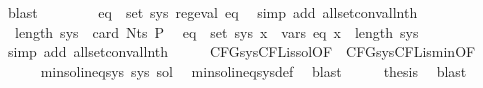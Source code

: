 \begin{isabellebody}
\ blast\isanewline
\ \ \isamarkupfalse%
\ \isamarkupfalse%
\ {\isacharasterisk}{\kern0pt}\ \isamarkupfalse%
\ {\isachardoublequoteopen}{\isasymforall}eq\ {\isasymin}\ set\ sys{\isachardot}{\kern0pt}\ reg{\isacharunderscore}{\kern0pt}eval\ eq{\isachardoublequoteclose}\ \isamarkupfalse%
\ {\isacharparenleft}{\kern0pt}simp\ add{\isacharcolon}{\kern0pt}\ all{\isacharunderscore}{\kern0pt}set{\isacharunderscore}{\kern0pt}conv{\isacharunderscore}{\kern0pt}all{\isacharunderscore}{\kern0pt}nth{\isacharparenright}{\kern0pt}\isanewline
\ \ \isamarkupfalse%
\ \isamarkupfalse%
\ {\isacharasterisk}{\kern0pt}\ {\isacartoucheopen}length\ sys\ {\isacharequal}{\kern0pt}\ card\ {\isacharparenleft}{\kern0pt}Nts\ P{\isacharparenright}{\kern0pt}{\isacartoucheclose}\ \isamarkupfalse%
\ {\isachardoublequoteopen}{\isasymforall}eq\ {\isasymin}\ set\ sys{\isachardot}{\kern0pt}\ {\isasymforall}x\ {\isasymin}\ vars\ eq{\isachardot}{\kern0pt}\ x\ {\isacharless}{\kern0pt}\ length\ sys{\isachardoublequoteclose}\isanewline
\ \ \ \ \isamarkupfalse%
\ {\isacharparenleft}{\kern0pt}simp\ add{\isacharcolon}{\kern0pt}\ all{\isacharunderscore}{\kern0pt}set{\isacharunderscore}{\kern0pt}conv{\isacharunderscore}{\kern0pt}all{\isacharunderscore}{\kern0pt}nth{\isacharparenright}{\kern0pt}\isanewline
\ \ \isamarkupfalse%
\ \isamarkupfalse%
\ CFG{\isacharunderscore}{\kern0pt}sys{\isacharunderscore}{\kern0pt}CFL{\isacharunderscore}{\kern0pt}is{\isacharunderscore}{\kern0pt}sol{\isacharbrackleft}{\kern0pt}OF\ {\isacharasterisk}{\kern0pt}{\isacharbrackright}{\kern0pt}\ CFG{\isacharunderscore}{\kern0pt}sys{\isacharunderscore}{\kern0pt}CFL{\isacharunderscore}{\kern0pt}is{\isacharunderscore}{\kern0pt}min{\isacharbrackleft}{\kern0pt}OF\ {\isacharasterisk}{\kern0pt}{\isacharbrackright}{\kern0pt}\isanewline
\ \ \ \ \isamarkupfalse%
\ {\isachardoublequoteopen}min{\isacharunderscore}{\kern0pt}sol{\isacharunderscore}{\kern0pt}ineq{\isacharunderscore}{\kern0pt}sys\ sys\ sol{\isachardoublequoteclose}\ \isamarkupfalse%
\ min{\isacharunderscore}{\kern0pt}sol{\isacharunderscore}{\kern0pt}ineq{\isacharunderscore}{\kern0pt}sys{\isacharunderscore}{\kern0pt}def\ \isamarkupfalse%
\ blast\isanewline
\ \ \isamarkupfalse%
\ \isamarkupfalse%
\ {\isacharquery}{\kern0pt}thesis\ \isamarkupfalse%
\ blast\isanewline

\end{isabellebody}

